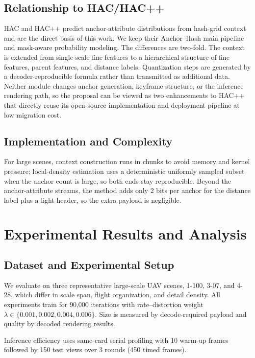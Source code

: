 \documentclass[conference]{IEEEtran}
\begin{document}
\subsection{Relationship to HAC/HAC++}
HAC \cite{chen2024} and HAC++ \cite{chen2025} predict anchor-attribute
distributions from hash-grid context and are the direct basis of this
work. We keep their Anchor--Hash main pipeline and mask-aware probability
modeling. The differences are two-fold. The context is extended from
single-scale fine features to a hierarchical structure of fine features,
parent features, and distance labels. Quantization steps are generated by
a decoder-reproducible formula rather than transmitted as additional
data. Neither module changes anchor generation, keyframe
structure, or the inference rendering path, so the proposal can be viewed
as two enhancements to HAC++ that directly reuse its open-source
implementation and deployment pipeline at low migration cost.

\subsection{Implementation and Complexity}
For large scenes, context construction runs in chunks to avoid memory
and kernel pressure; local-density estimation uses a deterministic
uniformly sampled subset when the anchor count is large, so both ends
stay reproducible. Beyond the anchor-attribute streams, the method adds
only 2 bits per anchor for the distance label plus a light header, so
the extra payload is negligible.

\section{Experimental Results and Analysis}
\subsection{Dataset and Experimental Setup}
We evaluate on three representative large-scale UAV scenes, 1-100, 3-07,
and 4-28, which differ in scale span, flight organization, and detail
density. All experiments train for 90,000 iterations with
rate--distortion weight $\lambda \in \{0.001, 0.002, 0.004, 0.006\}$.
Size is measured by decode-required payload and quality by decoded
rendering results.

Inference efficiency uses same-card serial profiling with 10 warm-up
frames followed by 150 test views over 3 rounds (450 timed frames).
\end{document}
